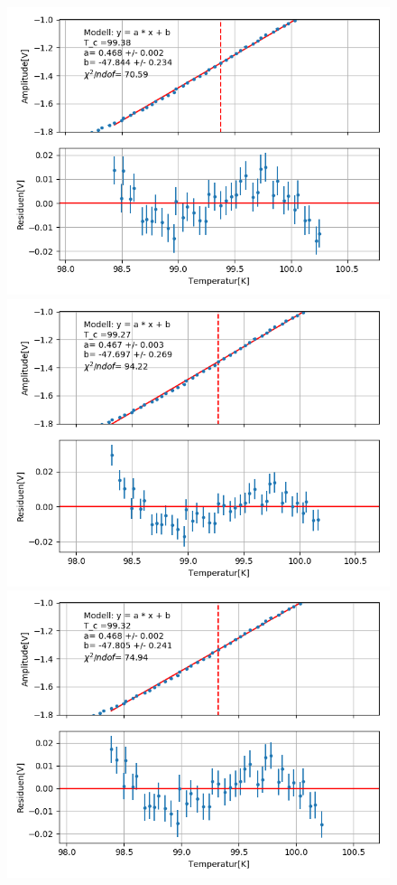 \documentclass[12pt,a4paper]{article}
\begin{document}
\begin{figure}
\centering
\includegraphics[scale=0.8]{Bilder/Haupt_Supra/X1_Steigung20.png}
\includegraphics[scale=0.5]{Bilder/Haupt_Supra/X1_Steigung21.png}
\includegraphics[scale=0.5]{Bilder/Haupt_Supra/X1_Steigung22.png}


\end{figure}
\end{document}
